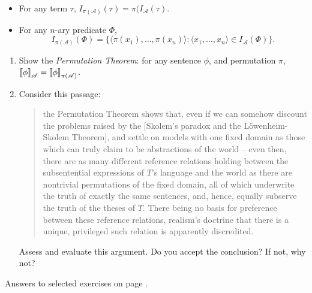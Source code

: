 {\begin{enumerate}
\begin{itemize}
	\item For any term $\tau$, $I_{\pi(\mathscr{A})}(\tau) = \pi(I_{\mathscr{A}}(\tau)$.
	\item For any $n$-ary predicate $\Phi$, $$I_{\pi(\mathscr{A})}(\Phi) = \{\langle \pi(x_{1}),\ldots,\pi(x_{n})\rangle:\langle x_{1},\ldots, x_{n}\rangle \in I_{\mathscr{A}}(\Phi)\}.$$
\end{itemize}  \begin{enumerate}
	\item Show the \emph{Permutation Theorem}: for any sentence $\phi$, and permutation $\pi$, $\left\llbracket \phi\right\rrbracket_{\mathscr{A}} = \left\llbracket \phi\right\rrbracket_{\mathscr{\pi(A)}}$.
	\item Consider this passage: \begin{quotation}
		the Permutation Theorem shows that, even if we can somehow discount the problems raised by the [Skolem's paradox and the L\"owenheim-Skolem Theorem], and settle on models with one fixed domain as those which can truly claim to be abstractions of the world – even then, there are as many different reference relations holding between the subsentential expressions of $T$'s language and the world as there are nontrivial permutations of the fixed domain, all of which underwrite the truth of exactly the same sentences, and, hence, equally subserve the truth of the theses of $T$. There being no basis for preference between these reference relations, realism's doctrine that there is a unique, privileged such relation is apparently discredited. \citep[53--4]{taymodtrr}
	\end{quotation}Assess and evaluate this argument. Do you accept the conclusion? If not, why not?
\end{enumerate}
 \end{enumerate}


Answers to selected exercises on page \pageref{ans:lequals}.
}



